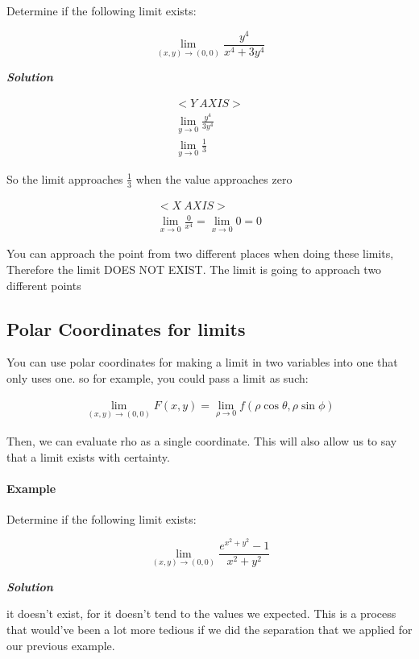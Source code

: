 \documentclass[11pt,fleqn]{book} %
\begin{document}
Determine if the following limit exists:

$$\lim_{(x,y)\to(0,0)} \frac{y^4}{x^4+3y^4}$$

\textit{\textbf{Solution}}

\begin{gather}
<Y \ AXIS>\\
    \lim_{y \to 0} \frac{y^4}{3y^4}\\
    \lim_{y \to 0} \frac{1}{3}
\end{gather}

So the limit approaches $\frac{1}{3}$ when the value approaches zero

\begin{gather}
    <X \ AXIS>\\
    \lim_{x \to 0} \frac{0}{x^4} = \lim_{x\to 0} 0 = 0    
\end{gather}

You can approach the point from two different places when doing these limits, 
Therefore the limit DOES NOT EXIST. The limit is going to approach two different points


\subsection{Polar Coordinates for limits}

You can use polar coordinates for making a limit in two variables into one that only uses one.
so for example, you could pass a limit as such:

\begin{gather}
    \lim_{(x,y) \to (0,0)} F(x,y) = \lim_{\rho \to 0} f(\rho \cos{\theta}, \rho \sin{\phi})
\end{gather}

Then, we can evaluate rho as a single coordinate. This will also allow us to say that a limit exists
with certainty. 

\paragraph{Example}

Determine if the following limit exists:

$$\lim_{(x,y)\to(0,0)} \frac{e^{x^2 + y^2} - 1}{x^2 + y^2}$$

\textit{\textbf{Solution}}

it doesn't exist, for it doesn't tend to the values we expected. This is a process that would've been a lot more tedious if we did the separation that we 
applied for our previous example.
\end{document}
